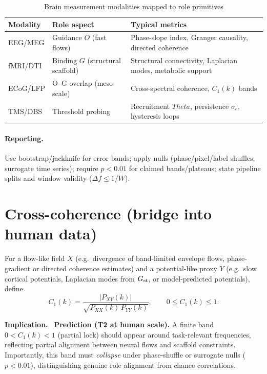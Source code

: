 \documentclass[12pt,a4paper,oneside]{scrreprt}
\def\Theta{Theta}%
\newenvironment{implication}{\par\vspace{0.5em}\noindent\textbf{Implication.}\ }{\par\vspace{0.5em}}
\begin{document}
\begin{table}[h!]
\centering
\caption{Brain measurement modalities mapped to role primitives}
\label{tab:brain-modalities}
\begin{tabular}{p{3cm}p{4cm}p{7cm}}
\toprule
\textbf{Modality} & \textbf{Role aspect} & \textbf{Typical metrics} \\
\midrule
EEG/MEG & Guidance $O$ (fast flows) & Phase-slope index, Granger causality, directed coherence \\
fMRI/DTI & Binding $G$ (structural scaffold) & Structural connectivity, Laplacian modes, metabolic support \\
ECoG/LFP & O--G overlap (meso-scale) & Cross-spectral coherence, $C_1(k)$ bands \\
TMS/DBS & Threshold probing & Recruitment $\Theta$, persistence $\sigma_c$, hysteresis loops \\
\bottomrule
\end{tabular}
\end{table}

\paragraph{Reporting.}
Use bootstrap/jackknife for error bands; apply nulls (phase/pixel/label shuffles, surrogate time series); require $p<0.01$ for claimed bands/plateaus; state pipeline splits and window validity ($\Delta f\le 1/W$).

\section{Cross-coherence (bridge into human data)}\label{sec:human-C1}
For a flow-like field $X$ (e.g.\ divergence of band-limited envelope flows, phase-gradient or directed coherence estimates) 
and a potential-like proxy $Y$ (e.g.\ slow cortical potentials, Laplacian modes from $G_{\rm st}$, or model-predicted potentials), define
\begin{equation}
C_1(k)=\frac{|P_{XY}(k)|}{\sqrt{P_{XX}(k)\,P_{YY}(k)}} , \qquad 0 \leq C_1(k) \leq 1 .
\end{equation}

\begin{implication}
\textbf{Prediction (T2 at human scale).} 
A finite band $0<C_1(k)<1$ (partial lock) should appear around task-relevant frequencies, reflecting partial alignment between neural flows and scaffold constraints. 
Importantly, this band must \emph{collapse} under phase-shuffle or surrogate nulls ($p<0.01$), distinguishing genuine role alignment from chance correlations. 
\end{implication}
\end{document}

